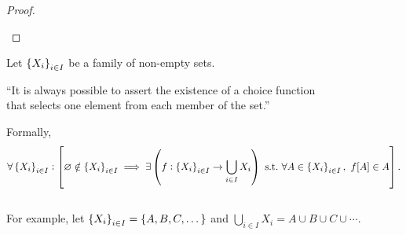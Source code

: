 \documentclass[11pt,openany]{article}
\begin{document}
\begin{proof}
\begin{enumerate}[(1)]
\end{enumerate}
\vspace{400pt}
\end{proof}

\newpage
\begin{note}
	Let $\set{X_i}_{i\in I}$ be a family of non-empty sets. \begin{center}
		``It is always possible to assert the existence of a choice function\\ that selects one element from each member of the set.''
	\end{center} Formally, \[
	\forall\set{X_i}_{i\in I}:\left[\varnothing\notin \set{X_i}_{i\in I}\implies\exists\left(f:\set{X_i}_{i\in I}\to\bigcup_{i\in I} X_i\right)\ \text{s.t.}\ \forall A\in\set{X_i}_{i\in I},\ f[A]\in A\right].
	\] 
	\vspace{24pt} \\
	\noindent For example, let $\set{X_i}_{i\in I}=\set{A,B,C,\dots}$ and $\bigcup_{i\in I}X_i=A\cup B\cup C\cup\cdots$.
	\begin{figure}[h!]\centering
		
	\end{figure}
\end{note}
%	
\end{document}
